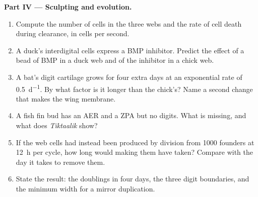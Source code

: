 \begin{problem}
\medskip
\noindent\textbf{Part IV --- Sculpting and evolution.}
\begin{enumerate}[resume]
  \item Compute the number of cells in the three webs and the rate
        of cell death during clearance, in cells per second.
  \item A duck's interdigital cells express a BMP inhibitor. Predict
        the effect of a bead of BMP in a duck web and of the
        inhibitor in a chick web.
  \item A bat's digit cartilage grows for four extra days at an
        exponential rate of \qty{0.5}{d^{-1}}. By what factor is it
        longer than the chick's? Name a second change that makes the
        wing membrane.
  \item A fish fin bud has an AER and a ZPA but no digits. What is
        missing, and what does \emph{Tiktaalik} show?
  \item If the web cells had instead been produced by division from
        \num{1000} founders at \qty{12}{h} per cycle, how long would
        making them have taken? Compare with the day it takes to
        remove them.
  \item State the result: the doublings in four days, the three digit
        boundaries, and the minimum width for a mirror duplication.
\end{enumerate}
\end{problem}

